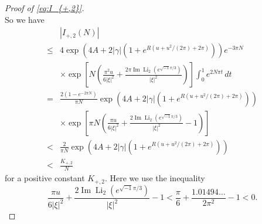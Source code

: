 \documentclass[a4paper]{amsart}
\theoremstyle{plain}
\theoremstyle{definition}
\theoremstyle{remark}
\newcommand{\Li}{\operatorname{Li}}
\renewcommand{\Im}{\operatorname{Im}}
\numberwithin{equation}{section}
\begin{document}
\begin{proof}[Proof of \eqref{eq:I_{+,2}}]
\begin{equation*}
\end{equation*}
So we have
\begin{equation*}
\begin{split}
  &|I_{+,2}(N)|
  \\
  \le&
  4\exp(4A+2|\gamma|(1+e^{R(u+u^2/(2\pi)+2\pi)}))
  e^{-3\pi N}
  \\
  &\times
  \exp
  \left[
  N
  \left(
    \frac{\pi^2u}{6|\xi|^2}
    +
    \frac{2\pi\Im\Li_2(e^{\sqrt{-1}\pi/3})}{|\xi|^2}
  \right)
  \right]
  \int_{0}^{1}e^{2N\pi t}\,dt
  \\
  =&
  \frac{2(1-e^{-2\pi N})}{\pi N}
  \exp(4A+2|\gamma|(1+e^{R(u+u^2/(2\pi)+2\pi)}))
  \\
  &\times
  \exp
  \left[
  \pi N
  \left(
    \frac{\pi u}{6|\xi|^2}
    +
    \frac{2\Im\Li_2(e^{\sqrt{-1}\pi/3})}{|\xi|^2}
    -1
  \right)
  \right]
  \\
  <&
  \frac{2}{\pi N}
  \exp(4A+2|\gamma|(1+e^{R(u+u^2/(2\pi)+2\pi)}))
  \\
  <&
  \frac{K_{+,2}}{N}
\end{split}
\end{equation*}
for a positive constant $K_{+,2}$.
Here we use the inequality
\begin{equation*}
  \frac{\pi u}{6|\xi|^2}
  +
  \frac{2\Im\Li_2(e^{\sqrt{-1}\pi/3})}{|\xi|^2}
  -1
  <
  \frac{\pi}{6}
  +\frac{1.01494\ldots}{2\pi^2}
  -1
  <0.
\end{equation*}
\end{proof}%
\end{document}
